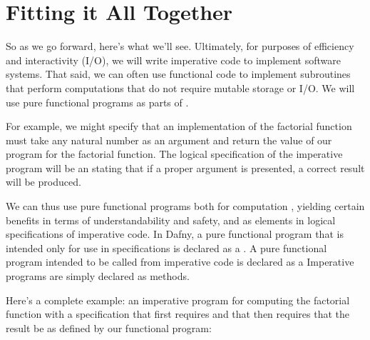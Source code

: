 \documentclass[letterpaper,10pt,english]{sphinxmanual}
\begin{document}
\section{Fitting it All Together}
\label{\detokenize{02-logic-and-code:fitting-it-all-together}}
So as we go forward, here’s what we’ll see. Ultimately, for purposes
of efficiency and interactivity (I/O), we will write imperative code
to implement software systems. That said, we can often use functional
code to implement subroutines that perform computations that do not
require mutable storage or I/O. We will  use pure functional
programs as parts of .

For example, we might specify that an  implementation of
the factorial function must take any natural number  as an argument
and return the value of  our  program for the
factorial function. The logical specification of the imperative
program will be an  stating that if a proper argument is
presented, a correct result  will
be produced.

We can thus use pure functional programs both for computation , yielding certain benefits in terms of understandability
and safety, and as elements in logical specifications of imperative
code. In Dafny, a pure functional program that is intended only for
use in specifications is declared as a . A pure functional
program intended to be called from imperative code is declared as a
 Imperative programs are simply declared as methods.

Here’s a complete example: an imperative program for computing the
factorial function with a specification that first requires 
and that then requires that the result be  as defined by
our functional program:
\end{document}
